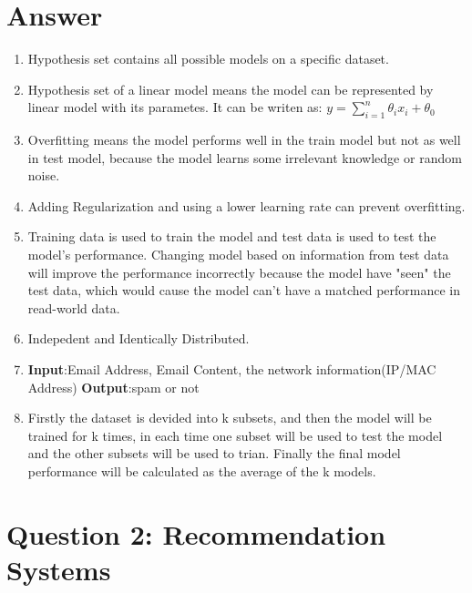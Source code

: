 \documentclass[
	12pt, %
]{fphw}
\begin{document}
\section*{Answer}
\begin{enumerate}
	\itemsep0.3em
	\parskip0.3em
	\item Hypothesis set contains all possible models on a specific dataset.
	\item Hypothesis set of a linear model means the model can be represented by linear model with its parametes. It can be writen as: $y = \sum_{i = 1}^{n}\theta_i x_i+\theta_0  $
	\item Overfitting means the model performs well in the train model but not as well in test model, because the model learns some irrelevant knowledge or random noise. 
	\item Adding Regularization and using a lower learning rate can prevent overfitting.
	\item Training data is used to train the model and test data is used to test the model's performance. Changing model based on information from test data will improve the performance incorrectly 
	because the model have "seen" the test data, which would cause the model can't have a matched performance in read-world data.
	\item Indepedent and Identically Distributed.
	\item \textbf{Input}:Email Address, Email Content, the network information(IP/MAC Address) \textbf{Output}:spam or not
	\item Firstly the dataset is devided into k subsets, and then the model will be trained for k times, in each time one subset will be used to test the model and the other subsets will be used to trian. Finally the final model performance will be calculated as the average of the k models.
\end{enumerate}


\section*{Question 2: Recommendation Systems}
\end{document}
